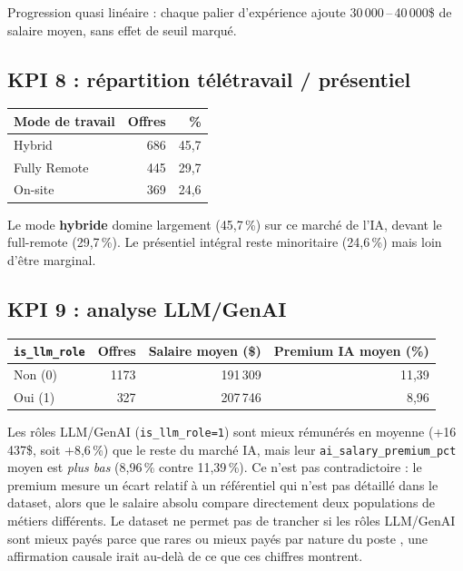 Progression quasi linéaire : chaque palier d'expérience ajoute
30\,000\,--\,40\,000\$ de salaire moyen, sans effet de seuil marqué.

\subsection{KPI 8 : répartition télétravail / présentiel}

\begin{center}
\begin{tabular}{lrr}
\toprule
Mode de travail & Offres & \% \\
\midrule
Hybrid & 686 & 45,7 \\
Fully Remote & 445 & 29,7 \\
On-site & 369 & 24,6 \\
\bottomrule
\end{tabular}
\end{center}

Le mode \textbf{hybride} domine largement (45,7\,\%) sur ce marché de
l'IA, devant le full-remote (29,7\,\%). Le présentiel intégral reste
minoritaire (24,6\,\%) mais loin d'être marginal.

\subsection{KPI 9 : analyse LLM/GenAI}

\begin{center}
\begin{tabular}{lrrr}
\toprule
\texttt{is\_llm\_role} & Offres & Salaire moyen (\$) & Premium IA moyen (\%) \\
\midrule
Non (0) & 1173 & 191\,309 & 11,39 \\
Oui (1) & 327 & 207\,746 & 8,96 \\
\bottomrule
\end{tabular}
\end{center}

\begin{constat}[Interprétation]
Les rôles LLM/GenAI (\texttt{is\_llm\_role=1}) sont mieux rémunérés en
moyenne (+16\,437\$, soit +8,6\,\%) que le reste du marché IA, mais leur
\texttt{ai\_salary\_premium\_pct} moyen est \emph{plus bas}
(8,96\,\% contre 11,39\,\%). Ce n'est pas contradictoire : le premium
mesure un écart relatif à un référentiel qui n'est pas détaillé dans le
dataset, alors que le salaire absolu compare directement deux
populations de métiers différents. Le dataset ne permet pas de trancher
si les rôles LLM/GenAI sont \og mieux payés parce que rares \fg{} ou
\og mieux payés par nature du poste \fg{}, une affirmation causale
irait au-delà de ce que ces chiffres montrent.
\end{constat}

